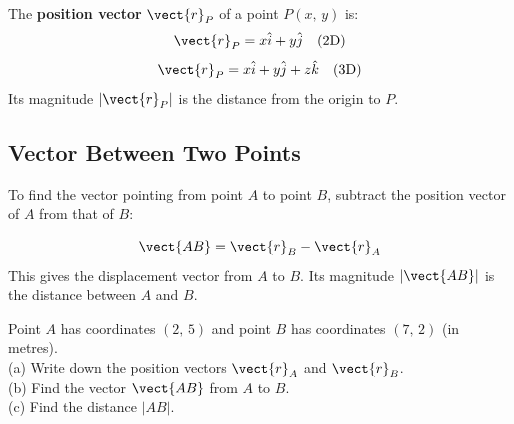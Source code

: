 \begin{definitionbox}
The \textbf{position vector} $\vect{r}_P$ of a point
$P(x,\,y)$ is:
\[
  \vect{r}_P = x\hat{i} + y\hat{j}
  \quad \text{(2D)}
\]
\[
  \vect{r}_P = x\hat{i} + y\hat{j} + z\hat{k}
  \quad \text{(3D)}
\]
Its magnitude $|\vect{r}_P|$ is the distance from the
origin to $P$.
\end{definitionbox}

\begin{diagbox}
\begin{center}
\end{center}
\end{diagbox}

\subsection*{Vector Between Two Points}

To find the vector pointing from point $A$ to point $B$,
subtract the position vector of $A$ from that of $B$:

\begin{lawbox}
\[
  \vect{AB} = \vect{r}_B - \vect{r}_A
\]
This gives the displacement vector from $A$ to $B$.
Its magnitude $|\vect{AB}|$ is the distance between $A$ and $B$.
\end{lawbox}

\begin{examplebox}[2.8]
Point $A$ has coordinates $(2,\,5)$ and point $B$ has
coordinates $(7,\,2)$ (in metres).\\
(a) Write down the position vectors $\vect{r}_A$ and
$\vect{r}_B$.\\
(b) Find the vector $\vect{AB}$ from $A$ to $B$.\\
(c) Find the distance $|AB|$.
\end{examplebox}

